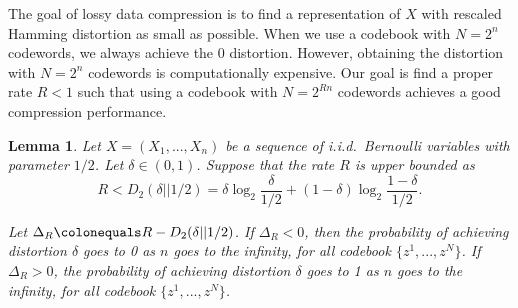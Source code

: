 \documentclass[11pt]{article}
\theoremstyle{plain}
\newtheorem{lem}{Lemma}
\theoremstyle{definition}
\begin{document}
 The goal of lossy data compression is to find a representation of $X$ with rescaled Hamming distortion as small as possible. When we use a codebook with $N = 2^n$ codewords, we always achieve the 0 distortion. However, obtaining the distortion with $N = 2^n$ codewords is computationally expensive. Our goal is find a proper rate  $R < 1$ such that using a codebook with $N = 2^{Rn}$ codewords achieves a good compression performance. 
 
 \begin{lem}
 	
 	Let $X=(X_1,...,X_n)$ be a sequence of i.i.d.\ Bernoulli variables with parameter $1/2$. Let $\delta \in (0,1)$. Suppose that the rate $R$ is upper bounded as
 	\begin{equation}
 		R < D_2(\delta || 1/2 ) = \delta \log_2 \frac{\delta}{1/2} + (1-\delta) \log_2 \frac{1-\delta}{1/2}.
 	\end{equation}
 	
 	Let  $\Delta_R \colonequals R - D_2(\delta || 1/2 )$. If $\Delta_R < 0$, 
 	then the probability of achieving distortion $\delta$ goes to 0 as $n$ goes to the infinity, for all codebook $\{z^1,...,z^N\}$. If $\Delta_R > 0$, the probability of achieving distortion $\delta$ goes to 1 as $n$ goes to the infinity, for all codebook $\{z^1,...,z^N\}$.
 	
 \end{lem}
 
\end{document}

